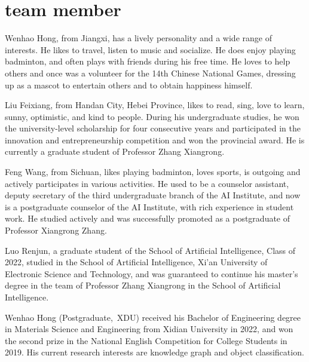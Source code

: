 \documentclass[journal]{IEEEtran}
\begin{document}
\section{team member}

Wenhao Hong, from Jiangxi, has a lively personality and a wide range of interests. He likes to travel, listen to music and socialize. He does enjoy playing badminton, and often plays with friends during his free time. He loves to help others and once was a volunteer for the 14th Chinese National Games, dressing up as a mascot to entertain others and to obtain happiness himself.

Liu Feixiang, from Handan City, Hebei Province, likes to read, sing, love to learn, sunny, optimistic, and kind to people. During his undergraduate studies, he won the university-level scholarship for four consecutive years and participated in the innovation and entrepreneurship competition and won the provincial award. He is currently a graduate student of Professor Zhang Xiangrong.

Feng Wang, from Sichuan, likes playing badminton, loves sports, is outgoing and actively participates in various activities. He used to be a counselor assistant, deputy secretary of the third undergraduate branch of the AI Institute, and now is a postgraduate counselor of the AI Institute, with rich experience in student work. He studied actively and was successfully promoted as a postgraduate of Professor Xiangrong Zhang. 

Luo Renjun, a graduate student of the School of Artificial Intelligence, Class of 2022, studied in the School of Artificial Intelligence, Xi'an University of Electronic Science and Technology, and was guaranteed to continue his master's degree in the team of Professor Zhang Xiangrong in the School of Artificial Intelligence.





\begin{IEEEbiography}{Wenhao Hong}
(Postgraduate,~XDU) received his Bachelor of Engineering degree in Materials Science and Engineering from Xidian University in 2022, and won the second prize in the National English Competition for College Students in 2019. His current research interests are knowledge graph and object classification. 
\end{IEEEbiography}
\end{document}
